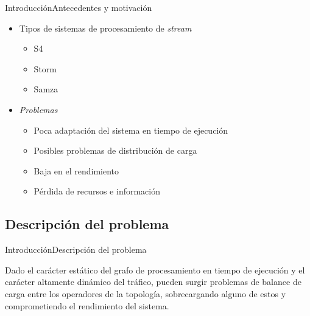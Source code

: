 \begin{frame}{Introducción}{Antecedentes y motivación}
\begin{itemize}
\item Tipos de sistemas de procesamiento de \textsl{stream}
	\begin{itemize}
	\item S4
	\item Storm
	\item Samza
	\end{itemize}
\item \textsl{Problemas}
	\begin{itemize}
	\item Poca adaptaci\'on del sistema en tiempo de ejecución
	\item Posibles problemas de distribución de carga
	\item Baja en el rendimiento
	\item Pérdida de recursos e información
	\end{itemize}
\end{itemize}
\end{frame}

\subsection*{Descripción del problema}

\begin{frame}{Introducción}{Descripción del problema}
\begin{block}{}
	Dado el carácter estático del grafo de procesamiento en tiempo de ejecución y el carácter altamente dinámico del tráfico, pueden surgir problemas de balance de carga entre los operadores de la topología, sobrecargando alguno de estos y comprometiendo el rendimiento del sistema.
\end{block}
\end{frame}